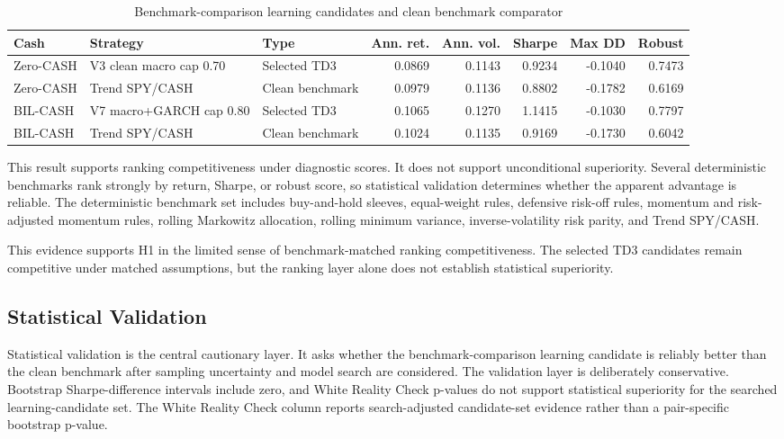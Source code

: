 \documentclass[12pt]{article}
\begin{document}
\begin{table}[htbp]
\centering
\caption{Benchmark-comparison learning candidates and clean benchmark comparator}
\scriptsize
\begin{tabularx}{\textwidth}{L{0.12\textwidth}Y L{0.16\textwidth}rrrrr}
\toprule
\textbf{Cash} & \textbf{Strategy} & \textbf{Type} & \textbf{Ann. ret.} & \textbf{Ann. vol.} & \textbf{Sharpe} & \textbf{Max DD} & \textbf{Robust} \\
\midrule
Zero-CASH & V3 clean macro cap 0.70 & Selected TD3 & 0.0869 & 0.1143 & 0.9234 & -0.1040 & 0.7473 \\
Zero-CASH & Trend SPY/CASH & Clean benchmark & 0.0979 & 0.1136 & 0.8802 & -0.1782 & 0.6169 \\
BIL-CASH & V7 macro+GARCH cap 0.80 & Selected TD3 & 0.1065 & 0.1270 & 1.1415 & -0.1030 & 0.7797 \\
BIL-CASH & Trend SPY/CASH & Clean benchmark & 0.1024 & 0.1135 & 0.9169 & -0.1730 & 0.6042 \\
\bottomrule
\end{tabularx}
\end{table}

This result supports ranking competitiveness under diagnostic scores. It does not support unconditional superiority. Several deterministic benchmarks rank strongly by return, Sharpe, or robust score, so statistical validation determines whether the apparent advantage is reliable. The deterministic benchmark set includes buy-and-hold sleeves, equal-weight rules, defensive risk-off rules, momentum and risk-adjusted momentum rules, rolling Markowitz allocation, rolling minimum variance, inverse-volatility risk parity, and Trend SPY/CASH.

This evidence supports H1 in the limited sense of benchmark-matched ranking competitiveness. The selected TD3 candidates remain competitive under matched assumptions, but the ranking layer alone does not establish statistical superiority.

\subsection{Statistical Validation}

Statistical validation is the central cautionary layer. It asks whether the benchmark-comparison learning candidate is reliably better than the clean benchmark after sampling uncertainty and model search are considered. The validation layer is deliberately conservative. Bootstrap Sharpe-difference intervals include zero, and White Reality Check p-values do not support statistical superiority for the searched learning-candidate set. The White Reality Check column reports search-adjusted candidate-set evidence rather than a pair-specific bootstrap p-value.
\end{document}

